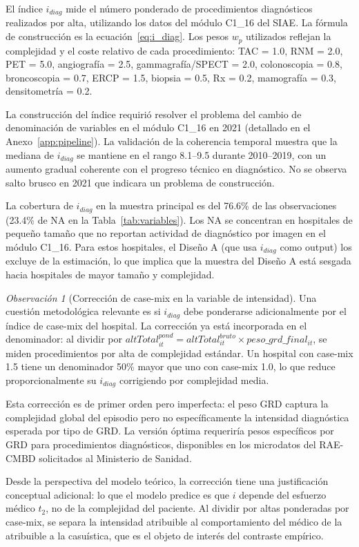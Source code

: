 \documentclass[12pt, a4paper, twoside, openright]{book}
\theoremstyle{plain}
\theoremstyle{definition}
\theoremstyle{remark}
\newtheorem{remark}{Observación}[chapter]
\begin{document}
El índice $i_{diag}$ mide el número ponderado de procedimientos diagnósticos realizados por alta, utilizando los datos del módulo C1\_16 del SIAE. La fórmula de construcción es la ecuación~\eqref{eq:i_diag}. Los pesos $w_p$ utilizados reflejan la complejidad y el coste relativo de cada procedimiento: TAC = 1.0, RNM = 2.0, PET = 5.0, angiografía = 2.5, gammagrafía/SPECT = 2.0, colonoscopia = 0.8, broncoscopia = 0.7, ERCP = 1.5, biopsia = 0.5, Rx = 0.2, mamografía = 0.3, densitometría = 0.2.

La construcción del índice requirió resolver el problema del cambio de denominación de variables en el módulo C1\_16 en 2021 (detallado en el Anexo~\ref{app:pipeline}). La validación de la coherencia temporal muestra que la mediana de $i_{diag}$ se mantiene en el rango 8.1--9.5 durante 2010--2019, con un aumento gradual coherente con el progreso técnico en diagnóstico. No se observa salto brusco en 2021 que indicara un problema de construcción.

La cobertura de $i_{diag}$ en la muestra principal es del 76.6\% de las observaciones (23.4\% de NA en la Tabla~\ref{tab:variables}). Los NA se concentran en hospitales de pequeño tamaño que no reportan actividad de diagnóstico por imagen en el módulo C1\_16. Para estos hospitales, el Diseño A (que usa $i_{diag}$ como output) los excluye de la estimación, lo que implica que la muestra del Diseño A está sesgada hacia hospitales de mayor tamaño y complejidad.

\begin{remark}[Corrección de case-mix en la variable de intensidad]
\label{rem:casemix_intensidad}
Una cuestión metodológica relevante es si $i_{diag}$ debe ponderarse adicionalmente por el índice de case-mix del hospital. La corrección ya está incorporada en el denominador: al dividir por $altTotal^{pond}_{it} = altTotal^{bruto}_{it}\times peso\_grd\_final_{it}$, se miden procedimientos por alta de complejidad estándar. Un hospital con case-mix 1.5 tiene un denominador 50\% mayor que uno con case-mix 1.0, lo que reduce proporcionalmente su $i_{diag}$ corrigiendo por complejidad media.

Esta corrección es de primer orden pero imperfecta: el peso GRD captura la complejidad global del episodio pero no específicamente la intensidad diagnóstica esperada por tipo de GRD. La versión óptima requeriría pesos específicos por GRD para procedimientos diagnósticos, disponibles en los microdatos del RAE-CMBD solicitados al Ministerio de Sanidad.

Desde la perspectiva del modelo teórico, la corrección tiene una justificación conceptual adicional: lo que el modelo predice es que $i$ depende del esfuerzo médico $t_2$, no de la complejidad del paciente. Al dividir por altas ponderadas por case-mix, se separa la intensidad atribuible al comportamiento del médico de la atribuible a la casuística, que es el objeto de interés del contraste empírico.
\end{remark}
\end{document}
